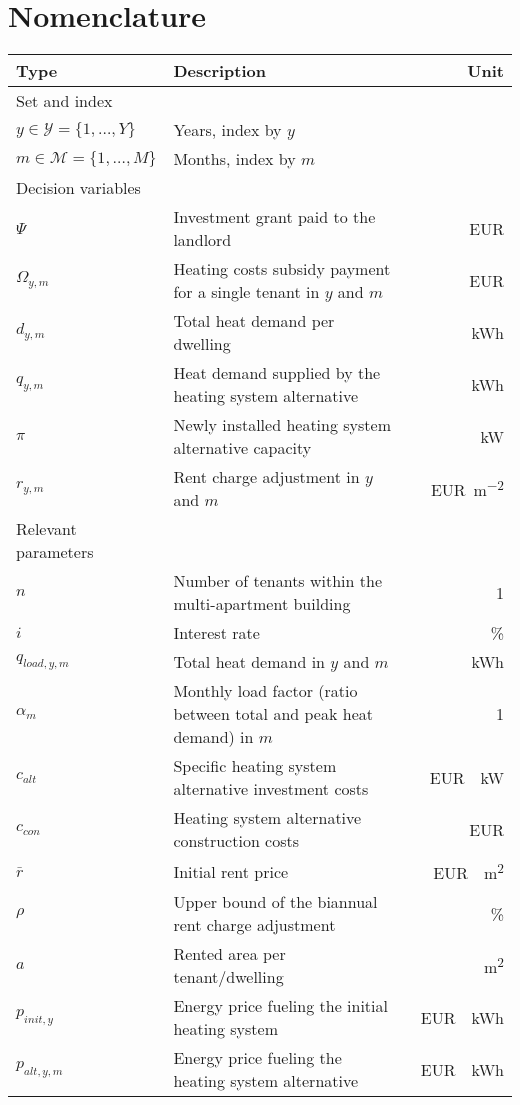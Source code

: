 \documentclass[review]{elsarticle}
\begin{document}
\section*{Nomenclature}
\begin{center}
	\renewcommand{\arraystretch}{1.1}
	\centering
	\small
	\begin{tabular}{lm{8cm}r}
		Type & Description & Unit\\
		\hline
		Set and index & & \\
		\hline
		
		{$y \in \mathcal{Y}=\{1,\ldots,Y\}$} & Years, index by $y$\\
		{$m \in \mathcal{M}=\{1,\ldots,M\}$} & Months, index by $m$\\
		
		\hline
		Decision variables\\
		\hline
		{$\Psi$} & Investment grant paid to the landlord & \SI{}{EUR}\\
		{$\Omega_{y,m}$} & Heating costs subsidy payment for a single tenant in $y$ and $m$ & \SI{}{EUR}\\
		{$d_{y,m}$} & Total heat demand per dwelling & \SI{}{kWh}\\
		{$q_{y,m}$} & Heat demand supplied by the heating system alternative & \SI{}{kWh}\\
		{$\pi$} & Newly installed heating system alternative capacity & \SI{}{kW}\\
		{$r_{y,m}$} & Rent charge adjustment in $y$ and $m$ & \SI{}{EUR\per m^2}\\
		\hline
		Relevant parameters\\
		\hline
		{$n$} & Number of tenants within the multi-apartment building & \SI{}{1}\\
		{$i$} & Interest rate & \SI{}{\%}\\
		{$q_{load,y,m}$} & Total heat demand in $y$ and $m$ & \SI{}{kWh}\\
		{$\alpha_{m}$} & Monthly load factor (ratio between total and peak heat demand) in $m$ & \SI{}{1}\\
		{$c_{alt}$} & Specific heating system alternative investment costs & \SI{}{EUR \per kW}\\
		{$c_{con}$} & Heating system alternative construction costs & \SI{}{EUR}\\
		{$\bar{r}$} & Initial rent price & \SI{}{EUR \per m^2}\\
		{$\rho$} & Upper bound of the biannual rent charge adjustment & \SI{}{\%}\\
		{$a$} & Rented area per tenant/dwelling & \SI{}{m^2}\\
		{$p_{init,y}$} & Energy price fueling the initial heating system & \SI{}{EUR \per kWh}\\
		{$p_{alt,y,m}$} & Energy price fueling the heating system alternative & \SI{}{EUR \per kWh}\\
		\hline
	\end{tabular}
\end{center}
\newpage
\end{document}
